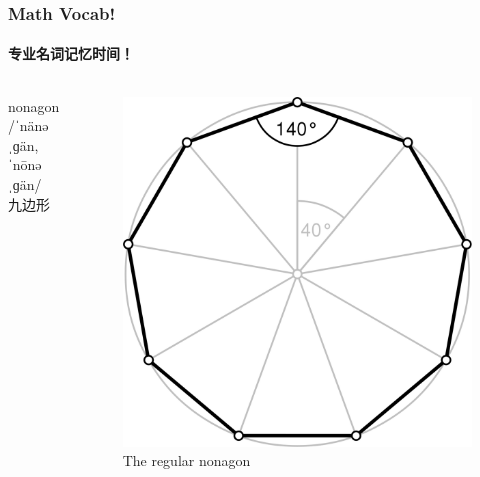 \documentclass[
	11pt, %
]{beamer}
\begin{document}
\begin{frame}
	\frametitle{Math Vocab!} %
	\framesubtitle{专业名词记忆时间！}
	
	\begin{columns}[t] 
	\begin{column}{0.4\textwidth} %
		{\Huge nonagon}\\
		{\LARGE /ˈnänəˌɡän,ˈnōnəˌɡän/\\
			\bigskip\bigskip
		九边形}
	\end{column}
	\begin{column}{0.6\textwidth} %
		\begin{figure}
			\includegraphics[width=0.8\linewidth]{nonagon.png}
			\caption{The regular nonagon}
		\end{figure}	
	\end{column}
\end{columns}
\end{frame}

\end{document}
